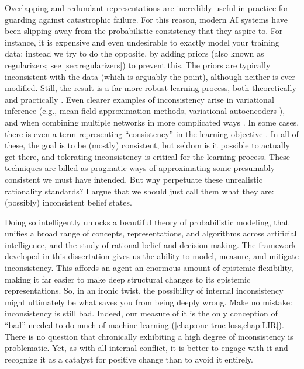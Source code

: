 Overlapping and redundant representations are incredibly useful in practice for guarding against catastrophic failure. 
For this reason, modern AI systems have been slipping away from the probabilistic consistency that they aspire to.
For instance, it is expensive and even undesirable to exactly model your training data; instead we try to do the opposite, by adding priors (also known as regularizers; see \cref{sec:regularizers}) to prevent this.
The priors are typically inconsistent with the data (which is arguably the point), although neither is ever modified. 
Still, the result is a far more robust learning process, both theoretically \cite{ftrl} and practically \cite{regularizers}.
%
Even clearer examples of inconsistency arise in variational inference
    (e.g., mean field approximation methods, variational autoencoders \cite{kingma2013autoencoding}),
    and when combining multiple networks 
        in more complicated ways \cite{}.
    In some cases, there is even a term representing ``consistency'' in the learning objective \cite{cycle-gan}. 
In all of these, the goal is to be (mostly) consistent, but seldom is it possible to actually get there,
and tolerating inconsistency is critical for the learning process.
%
These techniques are billed
    as pragmatic ways of approximating
    some presumably consistent we must have intended.
But why perpetuate these unrealistic rationality standards?
I argue that we should just call them what they are: (possibly) inconsistent belief states.

Doing so intelligently unlocks a beautiful theory of probabilistic modeling, that unifies a broad range of concepts, representations, and algorithms across artificial intelligence, and 
    the study of rational belief and decision making.
The framework developed in this dissertation
gives us the ability to model, measure, and mitigate inconsistency.
This affords an agent an enormous amount of epistemic flexibility,
    making it far easier to make deep structural changes to its epistemic
    representations.
So, in an ironic twist, the possibility of internal inconsistency might ultimately be what saves you from being deeply wrong. 
%
Make no mistake: inconsistency is still bad.
Indeed, our measure of it is the only conception of ``bad'' needed to do much of machine learning (\cref{chap:one-true-loss,chap:LIR}).
There is no question that chronically exhibiting a high degree of inconsistency is problematic.
%
Yet, as with all internal conflict, it is better to engage with it and recognize it as a catalyst for positive change
than to avoid it entirely. 

